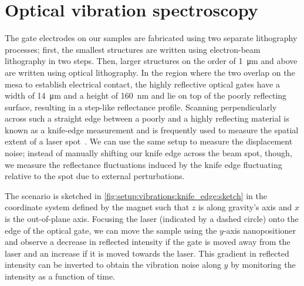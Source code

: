 \section{Optical vibration spectroscopy}\label{sec:setup:vibrations:optic}
The gate electrodes on our samples are fabricated using two separate lithography processes; first, the smallest structures are written using electron-beam lithography in two steps.
Then, larger structures on the order of \qty{1}{\micro\meter} and above are written using optical lithography.
In the region where the two overlap on the mesa to establish electrical contact, the highly reflective  optical gates have a width of \qty{14}{\micro\meter} and a height of \qty{160}{\nano\meter} and lie on top of the poorly reflecting  surface, resulting in a step-like reflectance profile.
Scanning perpendicularly across such a straight edge between a poorly and a highly reflecting material is known as a knife-edge measurement and is frequently used to measure the spatial extent of a laser spot~\cite{Arnaud1971,Skinner1972,Khosrofian1983}.
We can use the same setup to measure the displacement noise; instead of manually shifting our knife edge across the beam spot, though, we measure the reflectance fluctuations induced by the knife edge fluctuating relative to the spot due to external perturbations.

\begin{marginfigure}
    \centering
    
    \caption[]{
        Sketch of the region of the sample used for optical vibration spectroscopy.
        The coordinate system follows the magnet's; $z$ is parallel to gravity, and $x$ is perpendicular to the \gls{qw} plane.
        The optical gate extends further north as indicated by the dashed line.
    }
    \label{fig:setup:vibrations:knife_edge:sketch}
\end{marginfigure}

The scenario is sketched in \cref{fig:setup:vibrations:knife_edge:sketch} in the coordinate system defined by the magnet such that $z$ is along gravity's axis and $x$ is the out-of-plane axis.
Focusing the laser (indicated by a dashed circle) onto the edge of the optical gate, we can move the sample using the $y$-axis nanopositioner and observe a decrease in reflected intensity if the gate is moved away from the laser and an increase if it is moved towards the laser.
This gradient in reflected intensity can be inverted to obtain the vibration noise along $y$ by monitoring the intensity as a function of time.


